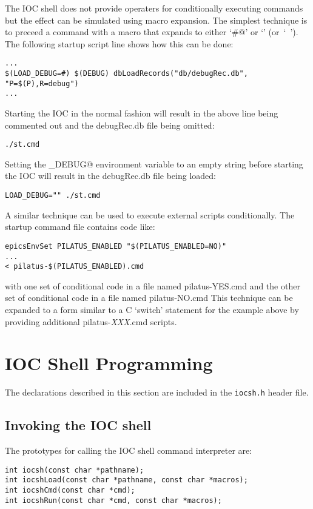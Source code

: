 The IOC shell does not provide operaters for conditionally executing commands
but the effect can be simulated using macro expansion.  The simplest
technique is to preceed a command with a macro that expands to either `\verb@#@' or `' (or~`~').
The following startup script line shows how this can be done:
\begin{verbatim}
...
$(LOAD_DEBUG=#) $(DEBUG) dbLoadRecords("db/debugRec.db", "P=$(P),R=debug")
...
\end{verbatim}
Starting the IOC in the normal fashion will result in the above line being
commented out and the debugRec.db file being omitted:
\begin{verbatim}
./st.cmd
\end{verbatim}
Setting the \verb@LOAD_DEBUG@ environment variable to an empty string before
starting the IOC will result in the debugRec.db file being loaded:
\begin{verbatim}
LOAD_DEBUG="" ./st.cmd
\end{verbatim}

A similar technique can be used to execute external scripts conditionally.
The startup command file contains code like:
\begin{verbatim}
epicsEnvSet PILATUS_ENABLED "$(PILATUS_ENABLED=NO)"
...
< pilatus-$(PILATUS_ENABLED).cmd
\end{verbatim}
with one set of conditional code in a file named pilatus-YES.cmd and
the other set of conditional code in a file named pilatus-NO.cmd
This technique can be expanded to a form similar to a C `switch' statement
for the example above by providing additional pilatus-{\it XXX}.cmd scripts.


\section{IOC Shell Programming}

The declarations described in this section are included in the \verb|iocsh.h| header file.

\subsection{Invoking the IOC shell}

The prototypes for calling the IOC shell command interpreter are:

\begin{verbatim}
int iocsh(const char *pathname);
int iocshLoad(const char *pathname, const char *macros);
int iocshCmd(const char *cmd);
int iocshRun(const char *cmd, const char *macros);
\end{verbatim}

